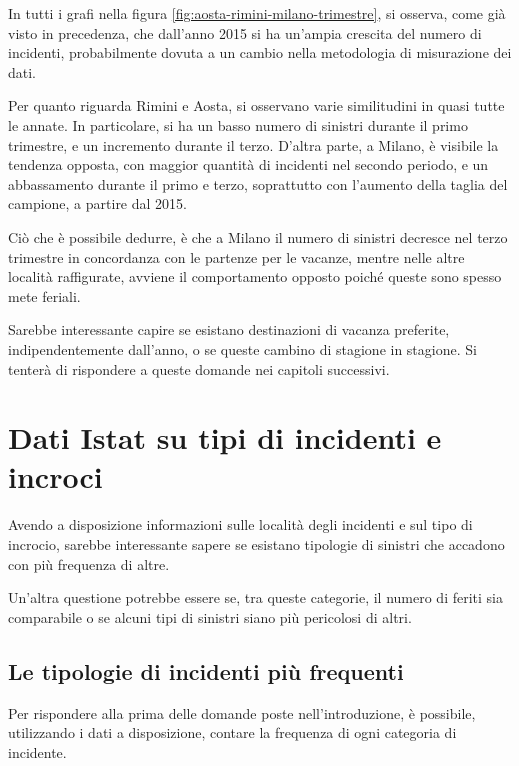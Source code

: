 \documentclass[a4paper,12pt]{report}
\begin{document}
In tutti i grafi nella figura \ref{fig:aosta-rimini-milano-trimestre}, 
si osserva, come già visto in precedenza, che dall'anno 2015 si ha un'ampia crescita  
del numero di incidenti, probabilmente dovuta a un cambio 
nella metodologia di misurazione dei dati. 

Per quanto riguarda Rimini e Aosta, si osservano varie similitudini in quasi 
tutte le annate. 
In particolare, si ha un basso numero di sinistri 
durante il primo trimestre, e un incremento durante il terzo. 
D'altra parte, a Milano, è visibile la tendenza opposta, con maggior quantità di 
incidenti nel secondo periodo, e un abbassamento durante il primo 
e terzo, soprattutto con l'aumento della taglia del campione, 
a partire dal 2015. 

Ciò che è possibile dedurre, è che a Milano il numero di sinistri decresce 
nel terzo trimestre in concordanza con le partenze per le vacanze, mentre nelle 
altre località raffigurate, avviene il comportamento opposto poiché 
queste sono spesso mete feriali. 

Sarebbe interessante capire se esistano destinazioni di vacanza preferite, 
indipendentemente dall'anno, o se queste cambino di stagione in stagione. 
Si tenterà di rispondere a queste domande nei capitoli successivi. 

\section{Dati Istat su tipi di incidenti e incroci}

Avendo a disposizione informazioni sulle località degli incidenti 
e sul tipo di incrocio, 
sarebbe interessante sapere se esistano tipologie di sinistri che accadono 
con più frequenza di altre. 

Un'altra questione potrebbe essere se, tra queste categorie, il numero di feriti 
sia comparabile o se alcuni tipi di sinistri siano più pericolosi di altri. 

\subsection{Le tipologie di incidenti più frequenti}

Per rispondere alla prima delle domande poste nell'introduzione, è possibile, 
utilizzando i dati a disposizione, contare la frequenza di ogni categoria di incidente. 
\end{document}
